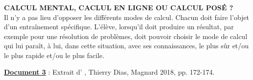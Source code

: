 \begin{center}
\begin{minipage}{15cm}
{         {\bf CALCUL MENTAL, CACLUL EN LIGNE OU CALCUL POSÉ ?} \\
         Il n'y a pas lieu d'opposer les différents modes de calcul. Chacun doit faire l'objet d'un entraînement spécifique. L'élève, lorsqu'il doit produire un résultat, par exemple pour une résolution de problèmes, doit pouvoir choisir le mode de calcul qui lui paraît, à lui, dans cette situation, avec ses connaissances, le plus sûr et/ou le plus rapide et/ou le plus facile.
         }
   \end{minipage}
\end{center}

\bigskip


{\bf\uline{Document 3}} : Extrait d' \fg, Thierry Dias, Magnard 2018, pp. 172-174.

